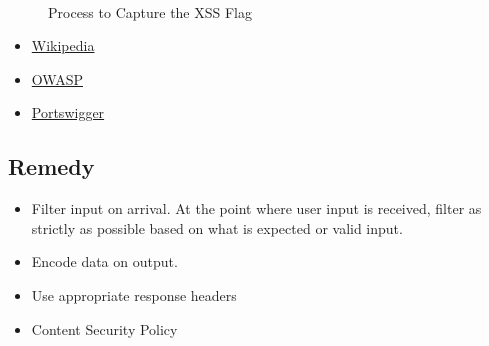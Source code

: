 \begin{figure}[!htb]
    \centering
     \quad
     \\
     \quad
    \caption[Flag 03 Method]{Process to Capture the XSS Flag} %
    \label{fig:flag03 method}
\end{figure}


\begin{itemize}
    \item \href{https://en.wikipedia.org/wiki/Cross-site_scripting}{Wikipedia}
    \item \href{https://owasp.org/www-community/attacks/xss/}{OWASP}
    \item \href{https://portswigger.net/web-security/cross-site-scripting}{Portswigger}
\end{itemize}

\subsection{Remedy}

\begin{itemize}
    \item Filter input on arrival. At the point where user input is received, filter as strictly as possible based on what is expected or valid input.
    \item Encode data on output.
    \item Use appropriate response headers
    \item Content Security Policy
\end{itemize}

